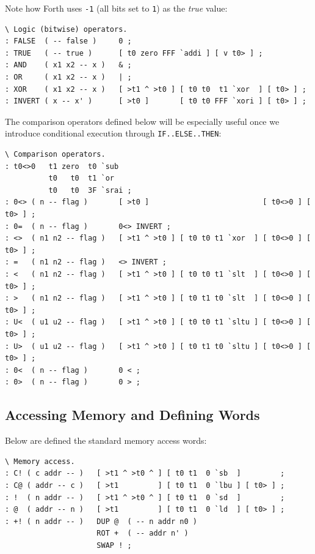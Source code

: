 \documentclass[a4paper,12pt,final]{article}
\begin{document}
Note how Forth uses \texttt{-1} (all bits set to \texttt{1}) as the \emph{true} value:

\fontsize{9pt}{9.000000pt}\selectfont
\begin{verbatim}
\ Logic (bitwise) operators.
: FALSE  ( -- false )     0 ;
: TRUE   ( -- true )      [ t0 zero FFF `addi ] [ v t0> ] ;
: AND    ( x1 x2 -- x )   & ;
: OR     ( x1 x2 -- x )   | ;
: XOR    ( x1 x2 -- x )   [ >t1 ^ >t0 ] [ t0 t0  t1 `xor  ] [ t0> ] ;
: INVERT ( x -- x' )      [ >t0 ]       [ t0 t0 FFF `xori ] [ t0> ] ;
\end{verbatim}
\normalsize

The comparison operators defined below will be especially useful once
we introduce conditional execution through \texttt{IF..ELSE..THEN}:

\fontsize{9pt}{9.000000pt}\selectfont
\begin{verbatim}
\ Comparison operators.
: t0<>0   t1 zero  t0 `sub
          t0   t0  t1 `or
          t0   t0  3F `srai ;
: 0<> ( n -- flag )       [ >t0 ]                          [ t0<>0 ] [ t0> ] ;
: 0=  ( n -- flag )       0<> INVERT ;
: <>  ( n1 n2 -- flag )   [ >t1 ^ >t0 ] [ t0 t0 t1 `xor  ] [ t0<>0 ] [ t0> ] ;
: =   ( n1 n2 -- flag )   <> INVERT ;
: <   ( n1 n2 -- flag )   [ >t1 ^ >t0 ] [ t0 t0 t1 `slt  ] [ t0<>0 ] [ t0> ] ;
: >   ( n1 n2 -- flag )   [ >t1 ^ >t0 ] [ t0 t1 t0 `slt  ] [ t0<>0 ] [ t0> ] ;
: U<  ( u1 u2 -- flag )   [ >t1 ^ >t0 ] [ t0 t0 t1 `sltu ] [ t0<>0 ] [ t0> ] ;
: U>  ( u1 u2 -- flag )   [ >t1 ^ >t0 ] [ t0 t1 t0 `sltu ] [ t0<>0 ] [ t0> ] ;
: 0<  ( n -- flag )       0 < ;
: 0>  ( n -- flag )       0 > ;
\end{verbatim}
\normalsize


\subsection{Accessing Memory and Defining Words}
\label{sec:org6c59b1f}

Below are defined the standard memory access words:

\fontsize{9pt}{9.000000pt}\selectfont
\begin{verbatim}
\ Memory access.
: C! ( c addr -- )   [ >t1 ^ >t0 ^ ] [ t0 t1  0 `sb  ]         ;
: C@ ( addr -- c )   [ >t1         ] [ t0 t1  0 `lbu ] [ t0> ] ;
: !  ( n addr -- )   [ >t1 ^ >t0 ^ ] [ t0 t1  0 `sd  ]         ;
: @  ( addr -- n )   [ >t1         ] [ t0 t1  0 `ld  ] [ t0> ] ;
: +! ( n addr -- )   DUP @  ( -- n addr n0 )
                     ROT +  ( -- addr n' )
                     SWAP ! ;
\end{verbatim}
\normalsize
\end{document}
